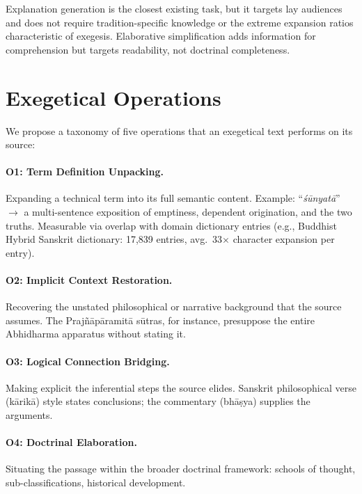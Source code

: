\documentclass[11pt]{article}
\begin{document}
Explanation generation \cite{camburu2018snli,wiegreffe2021measuring} is the closest existing task, but it targets lay audiences and does not require tradition-specific knowledge or the extreme expansion ratios characteristic of exegesis. Elaborative simplification \cite{srikanth2021elaborative} adds information for comprehension but targets readability, not doctrinal completeness.


\section{Exegetical Operations}
\label{sec:operations}

We propose a taxonomy of five operations that an exegetical text performs on its source:

\paragraph{O1: Term Definition Unpacking.}
Expanding a technical term into its full semantic content. Example: ``\textit{\'s\=unyat\=a}'' $\rightarrow$ a multi-sentence exposition of emptiness, dependent origination, and the two truths. Measurable via overlap with domain dictionary entries (e.g., Buddhist Hybrid Sanskrit dictionary: 17,839 entries, avg.\ 33$\times$ character expansion per entry).

\paragraph{O2: Implicit Context Restoration.}
Recovering the unstated philosophical or narrative background that the source assumes. The Praj\~n\=ap\=aramit\=a s\=utras, for instance, presuppose the entire Abhidharma apparatus without stating it.

\paragraph{O3: Logical Connection Bridging.}
Making explicit the inferential steps the source elides. Sanskrit philosophical verse (k\=arik\=a) style states conclusions; the commentary (bh\=a\d{s}ya) supplies the arguments.

\paragraph{O4: Doctrinal Elaboration.}
Situating the passage within the broader doctrinal framework: schools of thought, sub-classifications, historical development.
\end{document}
